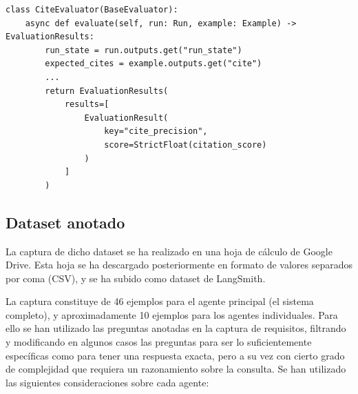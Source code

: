 \begin{lstlisting}[caption={Evaluador de citas},label={lst:cite_evaluator}]
class CiteEvaluator(BaseEvaluator):
    async def evaluate(self, run: Run, example: Example) -> EvaluationResults:
        run_state = run.outputs.get("run_state")
        expected_cites = example.outputs.get("cite")
        ...
        return EvaluationResults(
            results=[
                EvaluationResult(
                    key="cite_precision",
                    score=StrictFloat(citation_score)
                )
            ]
        )
\end{lstlisting}




\subsection{Dataset anotado}
La captura de dicho dataset se ha realizado en una hoja de cálculo de Google Drive. Esta hoja se ha descargado posteriormente en formato de valores separados por coma (CSV), y se ha subido como dataset de LangSmith. 

La captura constituye de 46 ejemplos para el agente principal (el sistema completo), y aproximadamente 10 ejemplos para los agentes individuales. Para ello se han utilizado las preguntas anotadas en la captura de requisitos, filtrando y modificando en algunos casos las preguntas para ser lo suficientemente específicas como para tener una respuesta exacta, pero a su vez con cierto grado de complejidad que requiera un razonamiento sobre la consulta. Se han utilizado las siguientes consideraciones sobre cada agente: 


